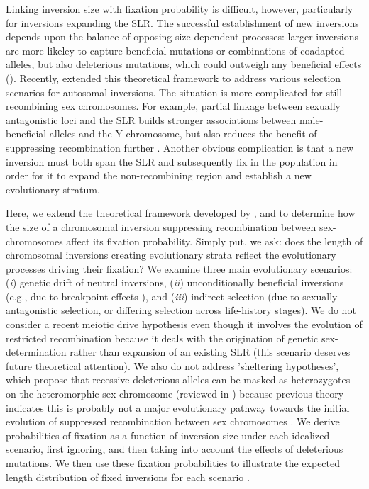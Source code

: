 \documentclass{article}[12pt]
\begin{document}
Linking inversion size with fixation probability is difficult, however, particularly for inversions expanding the SLR. The successful establishment of new inversions depends upon the balance of opposing size-dependent processes: larger inversions are more likeley to capture beneficial mutations or combinations of coadapted alleles, but also deleterious mutations, which could outweigh any beneficial effects (\citealt{Nei1967,vanValenLevins1968, Santos1986, ChengKirkpatrick2019}). Recently, \citet{ConnallonOlito2020} extended this theoretical framework to address various selection scenarios for autosomal inversions. The situation is more complicated for still-recombining sex chromosomes. For example, partial linkage between sexually antagonistic loci and the SLR builds stronger associations between male-beneficial alleles and the Y chromosome, but also reduces the benefit of suppressing recombination further \citep{Nei1969,Otto2019}. Another obvious complication is that a new inversion must both span the SLR and subsequently fix in the population in order for it to expand the non-recombining region and establish a new evolutionary stratum. 

Here, we extend the theoretical framework developed by \citet{vanValenLevins1968, Santos1986}, and \citet{ConnallonOlito2020} to determine how the size of a chromosomal inversion suppressing recombination between sex-chromosomes affect its fixation probability. Simply put, we ask: does the length of chromosomal inversions creating evolutionary strata reflect the evolutionary processes driving their fixation? We examine three main evolutionary scenarios: ({\itshape i}) genetic drift of neutral inversions, ({\itshape ii}) unconditionally beneficial inversions (e.g., due to breakpoint effects \citealt{CorbettDetig2016}), and ({\itshape iii}) indirect selection (due to sexually antagonistic selection, or differing selection across life-history stages). We do not consider a recent meiotic drive hypothesis \citep{UbedaPatten2010} even though it involves the evolution of restricted recombination because it deals with the origination of genetic sex-determination rather than expansion of an existing SLR (this scenario deserves future theoretical attention). We also do not address 'sheltering hypotheses', which propose that recessive deleterious alleles can be masked as heterozygotes on the heteromorphic sex chromosome (reviewed in \citealt{Ironside2010, Ponnikas2018, Charlesworth2017}) because previous theory indicates this is probably not a major evolutionary pathway towards the initial evolution of suppressed recombination between sex chromosomes \citep{Fisher1935, Olito2020}. We derive probabilities of fixation as a function of inversion size under each idealized scenario, first ignoring, and then taking into account the effects of deleterious mutations. We then use these fixation probabilities to illustrate the expected length distribution of fixed inversions for each scenario \citep[after][]{vanValenLevins1968,Santos1986}. 
\end{document}

